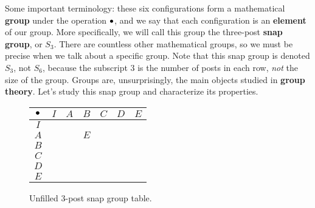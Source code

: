 \documentclass[../gatm.tex]{subfiles}
\begin{document}
Some important terminology: these six configurations form a mathematical \textbf{group} under the operation $\bullet$, and we say that each configuration is an \textbf{element} of our group.
More specifically, we will call this group the three-post \textbf{snap group}, or $S_3$. There are countless other mathematical groups, so we must be precise when we talk about a specific group. Note that this snap group is denoted $S_3$, not $S_6$, because the subscript $3$ is the number of posts in each row, \textit{not} the size of the group.
Groups are, unsurprisingly, the main objects studied in \textbf{group theory}.
Let's study this snap group and characterize its properties.

\begin{figure}
	\begin{center}
		\centering
		\begin{minipage}[b]{\textwidth}
			\centering
			\begin{tabular}{c|cccccc}
				\hline
				$\bullet$ & $I$ & $A$ & $B$ & $C$ & $D$ & $E$ \\ \hline
				\rowcolor{light-gray}
				$I$    &   &   &   &   &   &   \\ 
				$A$    &   &   & $E$ &   &   &   \\ 
				\rowcolor{light-gray}
				$B$    &   &   &   &   &   &   \\ 
				$C$    &   &   &   &   &   &   \\ 
				\rowcolor{light-gray}
				$D$    &   &   &   &   &   &   \\ 
				$E$    &   &   &   &   &   &   \\ \hline
			\end{tabular}
			\vspace*{0.5\baselineskip}
		\end{minipage}
	\end{center}
	\vspace*{-2\baselineskip}
	\begin{center}
		\begin{minipage}[t]{\textwidth}
			\caption{Unfilled $3$-post snap group table.}
			\label{fig:sbstable}
		\end{minipage}
	\end{center}
\end{figure}
\end{document}
